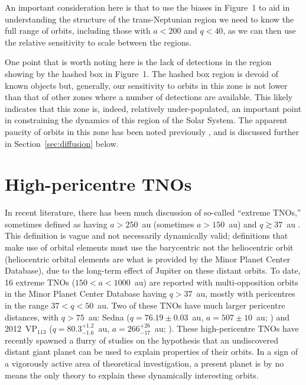 \documentclass{aastex62}
\begin{document}
An important consideration here is that to use the biases in Figure~1 to aid in understanding the structure of the trans-Neptunian region we need to know the full range of orbits, including those with $a< 200$ and $q<40$, as we can then use the relative sensitivity to scale between the regions. 

One point that is worth noting here is the lack of detections in the region showing by the hashed box in Figure~1.  The hashed box region is devoid of known objects but, generally, our sensitivity to orbits in this zone is not lower than that of other zones where a number of detections are available.  This likely indicates that this zone is, indeed, relatively under-populated, an important point in constraining the dynamics of this region of the Solar System.  The apparent paucity of orbits in this zone has been noted previously \citep[e.g.][]{bannister18,sheppard18}, and is discussed further in Section~\ref{sec:diffusion} below.

\section{High-pericentre TNOs} \label{sec:highq}

In recent literature, there has been much discussion of so-called ``extreme TNOs,'' sometimes defined as having $a>250$~au (sometimes $a>150$~au) and $q\gtrsim37$~au \citep{Sheppardetal2016,bannister17}.
This definition is vague and not necessarily dynamically valid; definitions that make use of orbital elements must use the barycentric not the heliocentric orbit (heliocentric orbital elements are what is provided by the Minor Planet Center Database), due to the long-term effect of Jupiter on these distant orbits.
To date, 16 extreme TNOs ($150<a<1000$~au) are reported with multi-opposition orbits in the Minor Planet Center Database having $q>37$~au, mostly with pericentres in the range $37<q<50$~au.
Two of these TNOs have much larger pericentre distances, with $q>75$~au: Sedna ($q=76.19 \pm 0.03$~au, $a=507 \pm 10$~au; \citealt{brownetal04}) and 2012~VP$_{113}$ ($q=80.3^{+1.2}_{-1.6}$~au, $a = 266^{+26}_{-17}$~au; \citealt{trujillosheppard14}). 
These high-pericentre TNOs have recently spawned a flurry of studies on the hypothesis that an undiscovered distant giant planet can be used to explain properties of their orbits. 
In a sign of a vigorously active area of theoretical investigation, a present planet is by no means the only theory to explain these dynamically interesting orbits.
\end{document}
